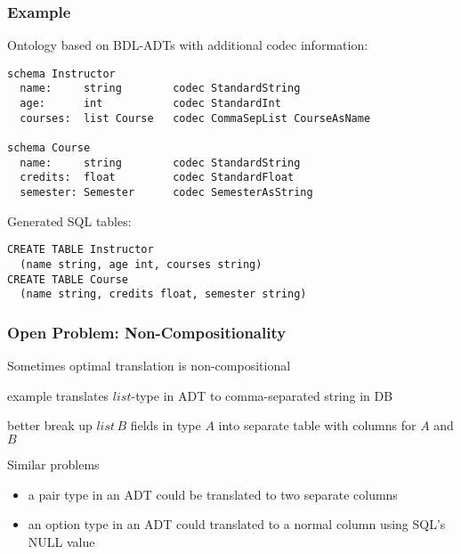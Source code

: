 \begin{frame}[fragile]\frametitle{Example}
Ontology based on BDL-ADTs with additional codec information:
\begin{lstlisting}[basicstyle=\footnotesize]
schema Instructor
  name:     string        codec StandardString
  age:      int           codec StandardInt
  courses:  list Course   codec CommaSepList CourseAsName

schema Course
  name:     string        codec StandardString
  credits:  float         codec StandardFloat
  semester: Semester      codec SemesterAsString
\end{lstlisting}
\medskip

Generated SQL tables:
\begin{lstlisting}[basicstyle=\footnotesize]
CREATE TABLE Instructor
  (name string, age int, courses string)
CREATE TABLE Course
  (name string, credits float, semester string)
\end{lstlisting}
\end{frame}

\begin{frame}\frametitle{Open Problem: Non-Compositionality}
\begin{blockitems}{Sometimes optimal translation is non-compositional}
\item example translates $list$-type in ADT to comma-separated string in DB
\item better break up $list\,B$ fields in type $A$ into separate table with columns for $A$ and $B$
\end{blockitems}

Similar problems
\begin{itemize}
\item a pair type in an ADT could be translated to two separate columns
\item an option type in an ADT could translated to a normal column using SQL's NULL value
\end{itemize}
\end{frame}


